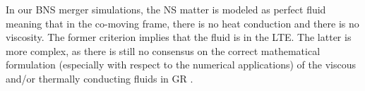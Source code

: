 %
In our \ac{BNS} merger simulations, the \ac{NS} matter is modeled as perfect fluid 
meaning that in the co-moving frame, 
there is no heat conduction and there is no viscosity. The former criterion implies that the fluid is in the \ac{LTE}. 
The latter is more complex, as there is still no consensus on the correct mathematical formulation 
(especially with respect to the numerical applications) of the viscous and/or thermally conducting fluids in 
\ac{GR} \citep[\eg][]{Andersson:2006nr}. 

%
%
